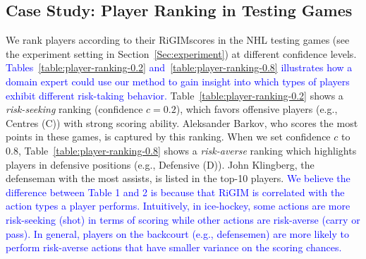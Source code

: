 \documentclass{article}
\newcommand{\confidence}{c}
\newcommand{\sys}{RiGIM}
\newcommand{\system}{\sys\;}
\begin{document}
\subsection{Case Study: Player Ranking in Testing Games}
\vspace{-0.05in}
We rank players according to their \system scores in the NHL testing games (see the experiment setting in Section~\ref{Sec:experiment}) at different confidence levels. 
\textcolor{blue}{Tables~\ref{table:player-ranking-0.2} and~\ref{table:player-ranking-0.8} illustrates how a domain expert could use our method to gain insight into which types of players exhibit different risk-taking behavior.}
Table~\ref{table:player-ranking-0.2} shows a {\it risk-seeking} ranking (confidence $\confidence=0.2$),  which favors offensive players (e.g., Centres (C)) with strong scoring ability. Aleksander Barkov, who scores the most points in these games, is captured by this ranking. When we set confidence $\confidence$ to 0.8, Table~\ref{table:player-ranking-0.8} shows a {\it risk-averse} ranking which highlights players in defensive positions (e.g., Defensive (D)). John Klingberg, the defenseman with the most assists, is listed in the top-10 players. 
\textcolor{blue}{We believe the difference between Table 1 and 2 is because that RiGIM is correlated with the action types a player performs. Intuitively, in ice-hockey, some actions are more risk-seeking (shot) in terms of scoring while other actions are risk-averse (carry or pass). In general, players on the backcourt (e.g., defensemen) are more likely to perform risk-averse actions that have smaller variance on the scoring chances.
}


\end{document}
